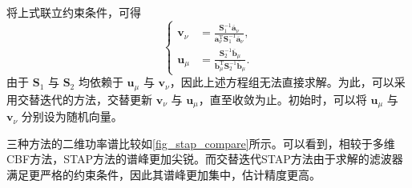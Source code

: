 将上式联立约束条件，可得
\[
    \begin{cases}
        \bm{v}_{\nu} & = \frac{\mathbf{S}_1^{-1} \overline{\bm{a}}_{\nu}}{\bm{a}_{\nu}^{\mathrm{T}} \mathbf{S}_1^{-1} \overline{\bm{a}}_{\nu}}, \\
        \bm{u}_{\mu} & = \frac{\mathbf{S}_2^{-1} \overline{\bm{b}}_{\mu}}{\bm{b}_{\mu}^{\mathrm{T}} \mathbf{S}_2^{-1} \overline{\bm{b}}_{\mu}}.
    \end{cases}
\]
由于 \( \mathbf{S}_1 \) 与 \( \mathbf{S}_2 \) 均依赖于 \( \bm{u}_{\mu} \) 与 \( \bm{v}_{\nu} \)，因此上述方程组无法直接求解。为此，可以采用交替迭代的方法，交替更新 \( \bm{v}_{\nu} \) 与 \( \bm{u}_{\mu} \)，直至收敛为止。初始时，可以将 \( \bm{u}_{\mu} \) 与 \( \bm{v}_{\nu} \) 分别设为随机向量。

三种方法的二维功率谱比较如\cref{fig_stap_compare}所示。可以看到，相较于多维CBF方法，STAP方法的谱峰更加尖锐。而交替迭代STAP方法由于求解的滤波器满足更严格的约束条件，因此其谱峰更加集中，估计精度更高。

